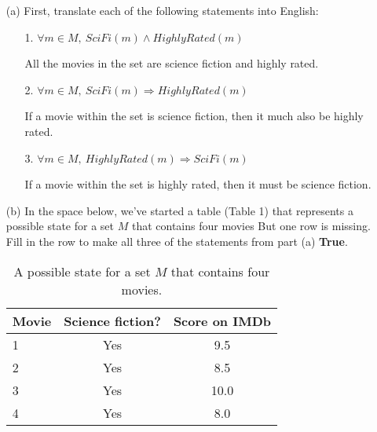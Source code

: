 \documentclass{article}
\begin{document}
\begin{enumerate}
\item[(a)]
First, translate each of the following statements into English:

\begin{enumerate}
\item[1.]
$\forall m \in M,~ SciFi(m) \land HighlyRated(m)$

\begin{framed}
All the movies in the set are science fiction and highly rated.
\end{framed}

\item[2.]
$\forall m \in M,~ SciFi(m) \Rightarrow HighlyRated(m)$

\begin{framed}
If a movie within the set is science fiction, then it much also be highly rated.
\end{framed}

\item[3.] $\forall m \in M,~ HighlyRated(m) \Rightarrow SciFi(m)$

\begin{framed}
If a movie within the set is highly rated, then it must be science fiction.
\end{framed}

\end{enumerate}

\item[(b)]
In the space below, we've started a table (Table 1) that represents a possible state for a set $M$ that contains four movies
But one row is missing.
Fill in the row to make all three of the statements from part (a) \textbf{True}.

\begin{table}[h!]
\centering
\caption{A possible state for a set $M$ that contains four movies.}
\begin{tabular}{|l|c|c|}
\hline
\textbf{Movie} & \textbf{Science fiction?} & \textbf{Score on IMDb} \\
\hline
1 & Yes & 9.5 \\
\hline
2 & Yes & 8.5 \\
\hline
3 & Yes & 10.0 \\
\hline
4 & Yes & 8.0 \\ %
\hline
\end{tabular}
\end{table}

\end{enumerate}
\end{document}
